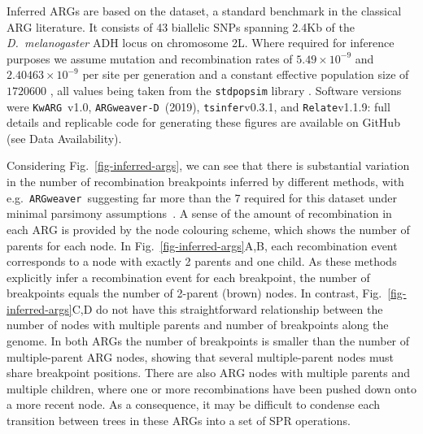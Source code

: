 \documentclass{article}
\newcommand{\tsinfer}[0]{\texttt{tsinfer}}
\newcommand{\kwarg}[0]{\texttt{KwARG}}
\newcommand{\argweaver}[0]{\texttt{ARGweaver}}
\newcommand{\argweaverD}[0]{\texttt{ARGweaver-D}}
\newcommand{\relate}[0]{\texttt{Relate}}
\begin{document}
Inferred ARGs are based on the \citet{kreitman1983nucleotide} dataset,
a standard benchmark in the classical ARG
literature.
It consists of 43 biallelic SNPs spanning 2.4Kb of the \emph{D.~melanogaster} ADH
locus on chromosome 2L. Where required for inference purposes we assume
mutation and recombination rates of $5.49\times10^{-9}$
and $2.40463\times10^{-9}$ per site per generation
\citep{schrider2013rates,comeron2012many}
and a constant effective population size of $1720600$ \citep{li2006inferring}, all
values being taken from the \texttt{stdpopsim} library
\citep{adrion2020community,lauterbur2023expanding}.
Software versions were \kwarg\ v1.0, \argweaverD\ (2019),
\tsinfer v0.3.1, and \relate v1.1.9: full details and replicable code for generating
these figures are available on GitHub (see Data Availability).

Considering Fig.~\ref{fig-inferred-args}, we can see that
there is substantial variation in the number of recombination breakpoints
inferred by different methods, with e.g.~\argweaver\ suggesting
far more than the 7 required for this dataset under minimal parsimony
assumptions~\citep{song2003parsimonious}.
A sense of the amount of recombination in each ARG is provided by
the node colouring scheme, which shows the number of parents for each node.
In Fig.~\ref{fig-inferred-args}A,B, each recombination event
corresponds to a node with exactly 2 parents and one child.
As these methods explicitly infer a recombination event for each
breakpoint, the number of breakpoints equals the number of 2-parent
(brown) nodes.
In contrast, Fig.~\ref{fig-inferred-args}C,D do not have this
straightforward
relationship between the number of nodes with multiple parents
and number of breakpoints along the genome.
In both ARGs the number of breakpoints is smaller
than the number of multiple-parent ARG nodes, showing
that several multiple-parent nodes must share breakpoint positions.
There are also ARG nodes with multiple parents and multiple children,
where one or more recombinations have been pushed down onto a
more recent node.
As a consequence, it may be difficult to condense each transition between trees
in these ARGs into a set of SPR operations.
\end{document}
